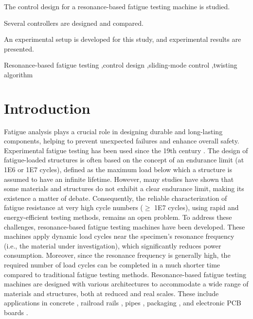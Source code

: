 \documentclass[preprint,12pt]{elsarticle}
\begin{document}
\begin{frontmatter}
\begin{highlights}
\item The control design for a resonance-based fatigue testing machine is studied.
\item Several controllers are designed and compared.
\item An experimental setup is developed for this study, and experimental results are presented.
\end{highlights}

\begin{keyword}
Resonance-based fatigue testing \sep control design \sep sliding-mode control \sep twisting algorithm
\end{keyword}

\end{frontmatter}


\twocolumn
\section{Introduction} \label{S_introduction}



Fatigue analysis plays a crucial role in designing durable and long-lasting components, helping to prevent unexpected failures and enhance overall safety. Experimental fatigue testing has been used since the 19th century \cite{radaj2007ermudungsfestigkeit}.
 The design of fatigue-loaded structures is often based on the concept of an endurance limit (at 1E6 or 1E7 cycles), defined as the maximum load below which a structure is assumed to have an infinite lifetime. However, many studies have shown that some materials and structures do not exhibit a clear endurance limit, making its existence a matter of debate. Consequently, the reliable characterization of fatigue resistance at very high cycle numbers ($\geq$ 1E7 cycles), using rapid and energy-efficient testing methods, remains an open problem. To address these challenges, resonance-based fatigue testing machines have been developed. These machines apply dynamic load cycles near the specimen’s resonance frequency (i.e., the material under investigation), which significantly reduces power consumption. Moreover, since the resonance frequency is generally high, the required number of load cycles can be completed in a much shorter time compared to traditional fatigue testing methods. Resonance-based fatigue testing machines are designed with various architectures to accommodate a wide range of materials and structures, both at reduced and real scales. These include applications in concrete \cite{SCHRAMM2024117045}, railroad rails \cite{SCHNEIDER2018171,herrmann2018simulation_Thesis}, pipes \cite{Santus_2024}, packaging \cite{Rouillard_2000}, and electronic PCB boards \cite{DORANGA2024115368,ikehara2010development}.
\end{document}
